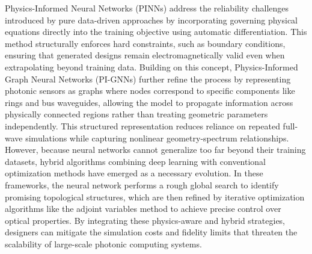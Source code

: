 \documentclass[11pt]{article}
\begin{document}
Physics-Informed Neural Networks (PINNs) address the reliability challenges introduced by pure data-driven approaches by incorporating governing physical equations directly into the training objective using automatic differentiation. \citep{doi_10_1007_s10444_023_10065_9_12bf0652} This method structurally enforces hard constraints, such as boundary conditions, ensuring that generated designs remain electromagnetically valid even when extrapolating beyond training data. Building on this concept, Physics-Informed Graph Neural Networks (PI-GNNs) further refine the process by representing photonic sensors as graphs where nodes correspond to specific components like rings and bus waveguides, allowing the model to propagate information across physically connected regions rather than treating geometric parameters independently. This structured representation reduces reliance on repeated full-wave simulations while capturing nonlinear geometry-spectrum relationships. However, because neural networks cannot generalize too far beyond their training datasets, hybrid algorithms combining deep learning with conventional optimization methods have emerged as a necessary evolution. In these frameworks, the neural network performs a rough global search to identify promising topological structures, which are then refined by iterative optimization algorithms like the adjoint variables method to achieve precise control over optical properties. By integrating these physics-aware and hybrid strategies, designers can mitigate the simulation costs and fidelity limits that threaten the scalability of large-scale photonic computing systems. \citep{s2_cc39d5405a933620426d86298fa8fe4cd51915c5_27626ee3} \citep{doi_10_1109_pn70808_2026_11657775_11c9905d} \citep{doi_10_1021_acsphotonics_2c00968_06a2e96b}
\end{document}
